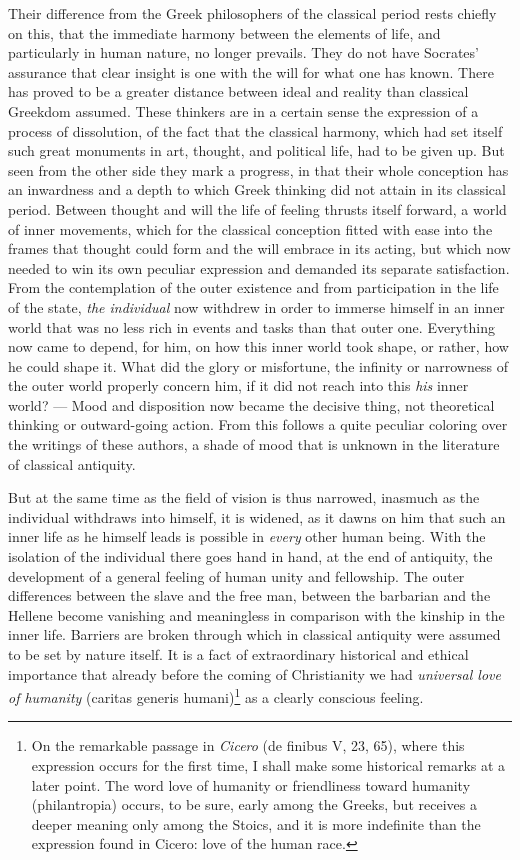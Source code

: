 \documentclass[12pt,a4paper,openany]{book}
\newcommand{\opage}[1]{\marginnote{\footnotesize\textit{[#1]}}}
\begin{document}
Their difference from the Greek philosophers of the classical period
rests chiefly on this, that the immediate harmony between the
elements of life, and particularly in human nature, no longer
prevails. They do not have Socrates' assurance that clear
insight is one with the will for what one has known. There has
proved to be a greater distance between ideal and reality
than classical Greekdom assumed. These thinkers are in a
certain sense the expression of a process of dissolution, of the
fact that the classical harmony, which had set itself such
great monuments in art, thought, and political life, had to be
given up. But seen from the other side they mark a
progress, in that their whole conception has an inwardness and
a depth to which Greek thinking did not attain in its
classical period. Between thought and will the life of feeling thrusts itself
forward, a world of inner movements, which for the classical
conception fitted with ease into the frames that thought
could form and the will embrace in its acting, but which now
needed to win its own peculiar expression and demanded
its separate satisfaction. From the contemplation of the
outer existence and from participation in the life of the state, \emph{the
individual} now withdrew in order to immerse himself in an inner world
that was no less rich in events and tasks
than that outer one. Everything now came to depend, for him, on how this inner
world took shape, or rather, how he could shape
it. What did the glory or misfortune, the infinity or narrowness of the outer world
properly concern him, if it did not
reach into this \emph{his} inner world? --- Mood and
disposition now became the decisive thing, not theoretical thinking
or outward-going action. From this follows a quite
peculiar coloring over the writings of these authors, a
shade of mood that is unknown in the literature of classical antiquity.

But at the same time as the field of vision is thus narrowed,
inasmuch as the individual withdraws into himself,
it is widened, as it dawns on him that such an inner life
as he himself leads is possible in \emph{every} other
human being. With the isolation of the individual there goes hand in hand, at the
\opage{160}end of antiquity, the development of a general feeling of human unity
and fellowship. The outer differences
between the slave and the free man, between the barbarian and the Hellene
become vanishing and meaningless in comparison with the kinship
in the inner life. Barriers are broken through which in
classical antiquity were assumed to be set by nature itself. It is a fact of
extraordinary historical and ethical importance
that already before the coming of Christianity we had
\emph{universal love of humanity} (caritas generis humani)\footnote{On the remarkable passage in \emph{Cicero} (de finibus V, 23, 65), where this
expression occurs for the first time, I shall make
some historical remarks at a later point. The word love of humanity or
friendliness toward humanity (philantropia) occurs, to be sure, early among the Greeks,
but receives a deeper meaning only among the Stoics, and it is more
indefinite than the expression found in Cicero: love of
the human race.} as
a clearly conscious feeling.
\end{document}
